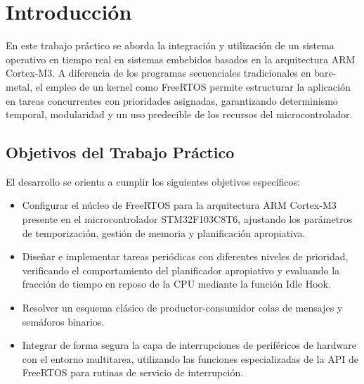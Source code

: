 \chapter{Introducción}

En este trabajo práctico se aborda la integración y utilización de un sistema operativo en tiempo real
en sistemas embebidos basados en la arquitectura ARM Cortex-M3. A diferencia de los programas secuenciales tradicionales
en bare-metal, el empleo de un kernel como FreeRTOS permite estructurar la aplicación en tareas concurrentes con
prioridades asignadas, garantizando determinismo temporal, modularidad y un uso predecible de los recursos del
microcontrolador.

\section{Objetivos del Trabajo Práctico}

El desarrollo se orienta a cumplir los siguientes objetivos específicos:

\begin{itemize}
  \item Configurar el núcleo de FreeRTOS para la arquitectura ARM Cortex-M3 presente en el microcontrolador
  STM32F103C8T6, ajustando los parámetros de temporización, gestión de memoria y planificación apropiativa.
  \item Diseñar e implementar tareas periódicas con diferentes niveles de prioridad, verificando el comportamiento
  del planificador apropiativo y evaluando la fracción de tiempo en reposo de la CPU mediante la función Idle Hook.
  \item Resolver un esquema clásico de productor-consumidor colas de mensajes y semáforos binarios.
  \item Integrar de forma segura la capa de interrupciones de periféricos de hardware con el entorno multitarea,
  utilizando las funciones especializadas de la API de FreeRTOS para rutinas de servicio de interrupción.
\end{itemize}

